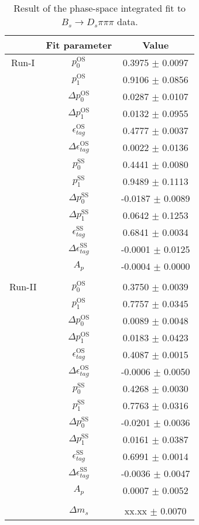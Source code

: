 \begin{table}[h]
\centering
\caption{Result of the phase-space integrated fit to $B_s \to D_s \pi \pi \pi$ data.}
\begin{tabular}{c c c}
\hline
\hline
& Fit parameter & Value \\
\hline
Run-I & $p_{0}^{\text{OS}}$ & 0.3975 $\pm$ 0.0097\\
&$p_{1}^{\text{OS}}$  & 0.9106 $\pm$ 0.0856\\
&$\Delta p_{0}^{\text{OS}}$  & 0.0287 $\pm$ 0.0107\\
&$\Delta p_{1}^{\text{OS}}$  & 0.0132 $\pm$ 0.0955\\
&$\epsilon_{tag}^{\text{OS}}$  & 0.4777 $\pm$ 0.0037\\
&$\Delta\epsilon_{tag}^{\text{OS}}$  & 0.0022 $\pm$ 0.0136\\
& $p_{0}^{\text{SS}}$ & 0.4441 $\pm$ 0.0080\\
&$p_{1}^{\text{SS}}$  & 0.9489 $\pm$ 0.1113\\
&$\Delta p_{0}^{\text{SS}}$  & -0.0187 $\pm$ 0.0089\\
&$\Delta p_{1}^{\text{SS}}$  & 0.0642 $\pm$ 0.1253\\
&$\epsilon_{tag}^{\text{SS}}$  & 0.6841 $\pm$ 0.0034\\
&$\Delta\epsilon_{tag}^{\text{SS}}$  & -0.0001 $\pm$ 0.0125\\
&$A_{p}$ & -0.0004 $\pm$ 0.0000\\
\\
Run-II & $p_{0}^{\text{OS}}$  & 0.3750 $\pm$ 0.0039\\
&$p_{1}^{\text{OS}}$  & 0.7757 $\pm$ 0.0345\\
&$\Delta p_{0}^{\text{OS}}$  & 0.0089 $\pm$ 0.0048\\
&$\Delta p_{1}^{\text{OS}}$  & 0.0183 $\pm$ 0.0423\\
&$\epsilon_{tag}^{\text{OS}}$  & 0.4087 $\pm$ 0.0015\\
&$\Delta\epsilon_{tag}^{\text{OS}}$  & -0.0006 $\pm$ 0.0050\\
& $p_{0}^{\text{SS}}$  & 0.4268 $\pm$ 0.0030\\
&$p_{1}^{\text{SS}}$  & 0.7763 $\pm$ 0.0316\\
&$\Delta p_{0}^{\text{SS}}$  & -0.0201 $\pm$ 0.0036\\
&$\Delta p_{1}^{\text{SS}}$  & 0.0161 $\pm$ 0.0387\\
&$\epsilon_{tag}^{\text{SS}}$  & 0.6991 $\pm$ 0.0014\\
&$\Delta\epsilon_{tag}^{\text{SS}}$  & -0.0036 $\pm$ 0.0047\\
&$A_{p}$ & 0.0007 $\pm$ 0.0052\\
\\
&$\Delta m_{s}$ &  xx.xx  $\pm$ 0.0070\\
\hline
\hline
\end{tabular}
\label{table:timeFit_norm}
\end{table}